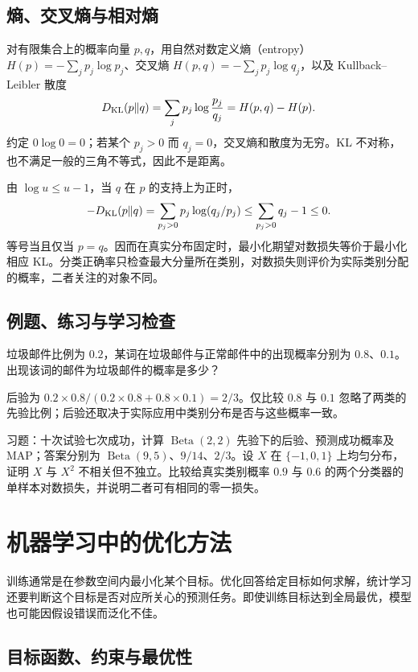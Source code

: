 \documentclass[UTF8,12pt,a4paper,fontset=fandol]{ctexbook}
\begin{document}
\section{熵、交叉熵与相对熵}

对有限集合上的概率向量 $p,q$，用自然对数定义熵（entropy）$H(p)=-\sum_jp_j\log p_j$、交叉熵 $H(p,q)=-\sum_jp_j\log q_j$，以及 Kullback--Leibler 散度
\[
 D_{\rm KL}(p\Vert q)=\sum_jp_j\log\frac{p_j}{q_j}
 =H(p,q)-H(p).
\]
约定 $0\log0=0$；若某个 $p_j>0$ 而 $q_j=0$，交叉熵和散度为无穷。KL 不对称，也不满足一般的三角不等式，因此不是距离。

由 $\log u\leq u-1$，当 $q$ 在 $p$ 的支持上为正时，
\[
 -D_{\rm KL}(p\Vert q)=\sum_{p_j>0}p_j\log(q_j/p_j)
 \leq\sum_{p_j>0}q_j-1\leq0.
\]
等号当且仅当 $p=q$。因而在真实分布固定时，最小化期望对数损失等价于最小化相应 KL。分类正确率只检查最大分量所在类别，对数损失则评价为实际类别分配的概率，二者关注的对象不同。

\section{例题、练习与学习检查}

\begin{example}[先验会改变分类]
垃圾邮件比例为 $0.2$，某词在垃圾邮件与正常邮件中的出现概率分别为 $0.8$、$0.1$。出现该词的邮件为垃圾邮件的概率是多少？
\end{example}
\begin{solve}
后验为 $0.2\times0.8/(0.2\times0.8+0.8\times0.1)=2/3$。仅比较 $0.8$ 与 $0.1$ 忽略了两类的先验比例；后验还取决于实际应用中类别分布是否与这些概率一致。
\end{solve}

习题：十次试验七次成功，计算 $\operatorname{Beta}(2,2)$ 先验下的后验、预测成功概率及 MAP；答案分别为 $\operatorname{Beta}(9,5)$、$9/14$、$2/3$。设 $X$ 在 $\{-1,0,1\}$ 上均匀分布，证明 $X$ 与 $X^2$ 不相关但不独立。比较给真实类别概率 $0.9$ 与 $0.6$ 的两个分类器的单样本对数损失，并说明二者可有相同的零一损失。

\chapter{机器学习中的优化方法}
\label{chap:ml-optimization}

训练通常是在参数空间内最小化某个目标。优化回答给定目标如何求解，统计学习还要判断这个目标是否对应所关心的预测任务。即使训练目标达到全局最优，模型也可能因假设错误而泛化不佳。

\section{目标函数、约束与最优性}
\end{document}
